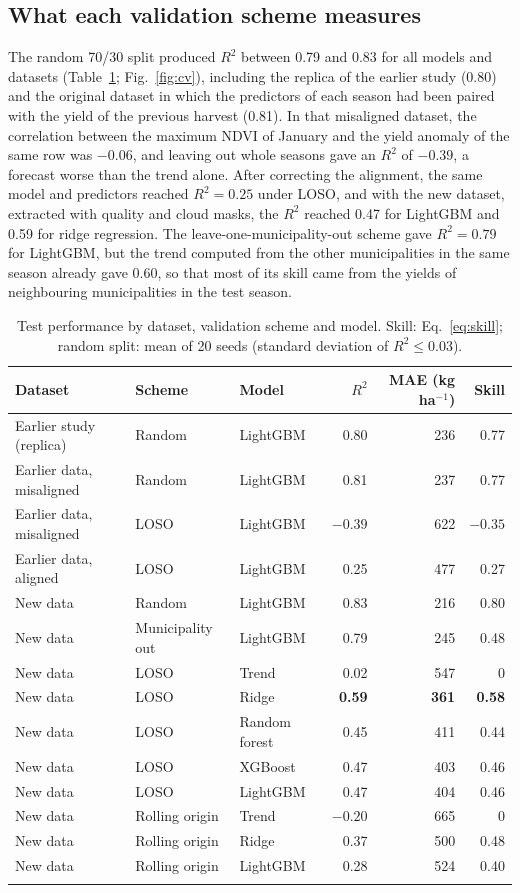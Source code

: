 \documentclass[pdflatex,sn-basic]{sn-jnl}
\begin{document}
\subsection{What each validation scheme measures}\label{sec:res_cv}
The random 70/30 split produced $R^2$ between 0.79 and 0.83 for all models and datasets (Table~\ref{tab:cv}; Fig.~\ref{fig:cv}), including the replica of the earlier study (0.80) and the original dataset in which the predictors of each season had been paired with the yield of the previous harvest (0.81). In that misaligned dataset, the correlation between the maximum NDVI of January and the yield anomaly of the same row was $-0.06$, and leaving out whole seasons gave an $R^2$ of $-0.39$, a forecast worse than the trend alone. After correcting the alignment, the same model and predictors reached $R^2 = 0.25$ under LOSO, and with the new dataset, extracted with quality and cloud masks, the $R^2$ reached 0.47 for LightGBM and 0.59 for ridge regression. The leave-one-municipality-out scheme gave $R^2 = 0.79$ for LightGBM, but the trend computed from the other municipalities in the same season already gave 0.60, so that most of its skill came from the yields of neighbouring municipalities in the test season.

\begin{table}[ht]
\caption{Test performance by dataset, validation scheme and model. Skill: Eq.~\ref{eq:skill}; random split: mean of 20 seeds (standard deviation of $R^2 \le 0.03$).}
\label{tab:cv}
\begin{tabular}{@{}lllrrr@{}}
\toprule
Dataset & Scheme & Model & $R^2$ & MAE (kg ha$^{-1}$) & Skill \\
\midrule
Earlier study (replica) & Random & LightGBM & 0.80 & 236 & 0.77 \\
Earlier data, misaligned & Random & LightGBM & 0.81 & 237 & 0.77 \\
Earlier data, misaligned & LOSO & LightGBM & $-0.39$ & 622 & $-0.35$ \\
Earlier data, aligned & LOSO & LightGBM & 0.25 & 477 & 0.27 \\
New data & Random & LightGBM & 0.83 & 216 & 0.80 \\
New data & Municipality out & LightGBM & 0.79 & 245 & 0.48 \\
New data & LOSO & Trend & 0.02 & 547 & 0 \\
New data & LOSO & Ridge & \textbf{0.59} & \textbf{361} & \textbf{0.58} \\
New data & LOSO & Random forest & 0.45 & 411 & 0.44 \\
New data & LOSO & XGBoost & 0.47 & 403 & 0.46 \\
New data & LOSO & LightGBM & 0.47 & 404 & 0.46 \\
New data & Rolling origin & Trend & $-0.20$ & 665 & 0 \\
New data & Rolling origin & Ridge & 0.37 & 500 & 0.48 \\
New data & Rolling origin & LightGBM & 0.28 & 524 & 0.40 \\
\botrule
\end{tabular}
\end{table}
\end{document}
